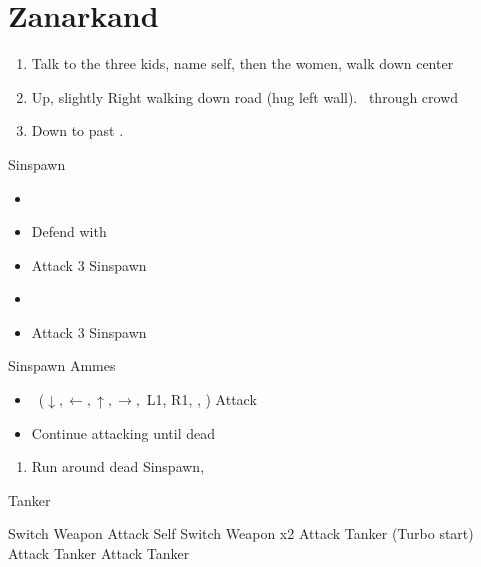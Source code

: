 \chapter{Zanarkand}

\begin{enumerate}
    \item Talk to the three kids, name self, then the women, walk down center
    \item Up, slightly Right walking down road (hug left wall). \sd\ through crowd
    \item Down to past \auron.
\end{enumerate}
\begin{battle}{Sinspawn}
    \begin{itemize}
        \item \sd
        \item Defend with \tidus
        \item Attack 3 Sinspawn
        \item \sd
        \item Attack 3 Sinspawn
    \end{itemize}
\end{battle}
\begin{battle}[2400]{Sinspawn Ammes}
    \begin{itemize}
        \item \sd
        \auronf \od\ ($\downarrow, \leftarrow, \uparrow, \rightarrow,$ L1, R1, \Cancel, \Confirm)
        \tidusf Attack
        \tidusf \od
        \item Continue attacking until dead
    \end{itemize}
\end{battle}
\begin{enumerate}[resume]
    \item Run around dead Sinspawn, \save
\end{enumerate}
\begin{battle}[1000]{Tanker}
    \begin{itemize}
        \tidusf Switch Weapon
        \auronf Attack Self
        \tidusf Switch Weapon x2
        \tidusf Attack Tanker (Turbo start)
        \auronf Attack Tanker
        \tidusf Attack Tanker
    \end{itemize}
\end{battle}
